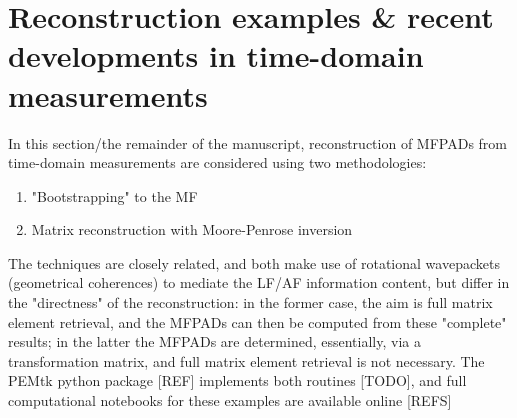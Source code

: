 \section{Reconstruction examples & recent developments in time-domain measurements}

In this section/the remainder of the manuscript, reconstruction of MFPADs from time-domain measurements are considered using two methodologies:

\begin{enumerate}
\item "Bootstrapping" to the MF \cite{hockett2018QMP1,hockett2018QMP2,marceau2017MolecularFrameReconstruction}
\item Matrix reconstruction with Moore-Penrose inversion \cite{gregory2021MolecularFramePhotoelectron}
\end{enumerate}

The techniques are closely related, and both make use of rotational wavepackets (geometrical coherences) to mediate the LF/AF information content, but differ in the "directness" of the reconstruction: in the former case, the aim is full matrix element retrieval, and the MFPADs can then be computed from these "complete" results; in the latter the MFPADs are determined, essentially, via a transformation matrix, and full matrix element retrieval is not necessary. The PEMtk python package [REF] implements both routines [TODO], and full computational notebooks for these examples are available online [REFS]